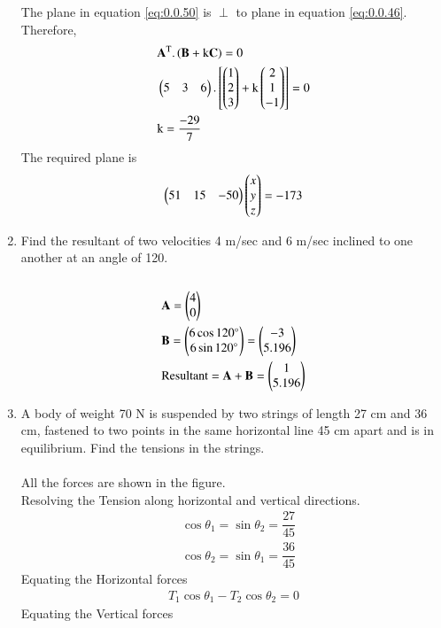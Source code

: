 \documentclass[journal,12pt,twocolumn]{IEEEtran}
\renewcommand\thesection{\arabic{section}}
\begin{document}
\begin{enumerate}[label=\thesection.\arabic*.,ref=\thesection.\theenumi]
The plane in equation \eqref{eq:0.0.50} is $\perp$ to plane in equation \eqref{eq:0.0.46}. Therefore,
\begin{align}  
&\mathbf{A}^\text T. \left(\mathbf{B}+\text k\mathbf{C}\right) =0\\
&\begin{pmatrix}5&3&6\end{pmatrix}.\left[\begin{pmatrix}1\\2\\3\end{pmatrix}+\text k\begin{pmatrix}2\\1\\-1\end{pmatrix}\right]=0\\
&\text k= \displaystyle\frac{-29}{7}
\end{align}
The required plane is \begin{align} \begin{pmatrix}51&15&-50\end{pmatrix}\begin{pmatrix}x\\y\\z\end{pmatrix}=-173 \end{align}
\item Find the resultant of two velocities 4 m/sec and 6 m/sec inclined to one another at an angle of 120\degree.\\
\solution\\
\begin{align}
& \mathbf{A} = \begin{pmatrix}4\\0\end{pmatrix}\\
& \mathbf{B}= \begin{pmatrix}6 \cos 120\degree\\6 \sin 120\degree \end{pmatrix} = \begin{pmatrix}-3\\5.196\end{pmatrix} \\
& \text{Resultant} = \mathbf{A+B} = \begin{pmatrix}1\\5.196\end{pmatrix}
\end{align}
\item A body of weight 70 N is suspended by two strings of length 27 cm and 36 cm, fastened to two points in the same horizontal line 45 cm apart and is in equilibrium. Find the tensions in the strings.\\
\solution\\
All the forces are shown in the figure.\\
Resolving the Tension along horizontal and vertical directions.\\
\begin{align}
&\cos \theta_1 = \sin \theta_2 = \dfrac{27}{45} \\
&\cos \theta_2 = \sin \theta_1 = \dfrac{36}{45}
\end{align}
Equating the Horizontal forces
\begin{align}
T_1\cos \theta_1 - T_2\cos \theta_2 =0
\end{align}
Equating the Vertical forces
\begin{align}

\end{align}
\end{enumerate}
\end{document}
